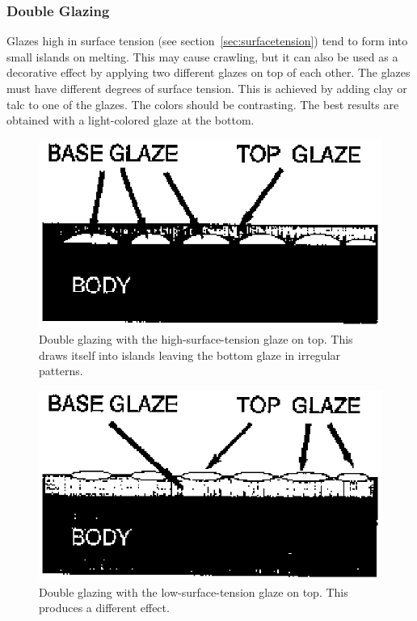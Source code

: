 \subsubsection{Double Glazing}
Glazes high in surface tension (see section~\ref{sec:surfacetension}) tend to 
form into small islands on melting. This may cause crawling, but it can also be 
used as a decorative effect by applying two different glazes on top of each 
other. The glazes must have different degrees of surface tension. This is 
achieved by adding clay or talc to one of the glazes. The colors should be 
contrasting. The best results are obtained with a light-colored glaze at the 
bottom.
\begin{figure}[htbp!]
  \centering
  \includegraphics[width=0.7\linewidth]{img/doubleglazinghigh.eps}
  \caption{Double glazing with the high-surface-tension glaze on top. This 
  draws itself into islands leaving the bottom glaze in irregular patterns.}
  \label{fig:doubleglazinghigh}
\end{figure}
\begin{figure}[htbp!]
  \centering
  \includegraphics[width=0.7\linewidth]{img/doubleglazinglow.eps}
  \caption{Double glazing with the low-surface-tension glaze on top. This 
  produces a different effect.}
  \label{fig:doubleglazinglow}
\end{figure}
